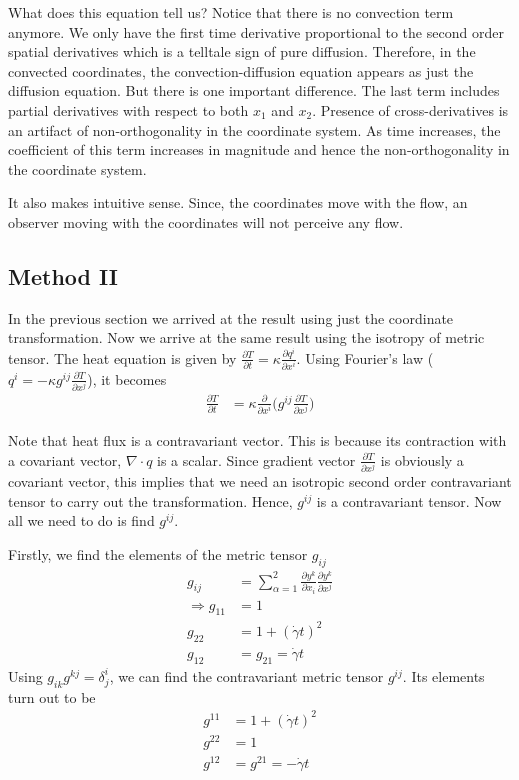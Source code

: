 \documentclass[11pt, letterpaper]{article}
\newcommand{\mdij}{\delta^i_j}
\newcommand{\1}{\bm{1}}
\newcommand{\gd}{\dot \gamma}
\newcommand{\pd}[2]{\frac{\partial #1}{\partial #2}}
\begin{document}
What does this equation tell us? Notice that there is no convection term anymore. We only have the first time derivative proportional to the second order spatial derivatives which is a telltale sign of pure diffusion. Therefore, in the convected coordinates, the convection-diffusion equation appears as just the diffusion equation. But there is one important difference. The last term includes partial derivatives with respect to both $x_1$ and $x_2$. Presence of cross-derivatives is an artifact of non-orthogonality in the coordinate system. As time increases, the coefficient of this term increases in magnitude and hence the non-orthogonality in the coordinate system. 

It also makes intuitive sense. Since, the coordinates move with the flow, an observer moving with the coordinates will not perceive any flow. 

\subsection{Method II}

In the previous section we arrived at the result using just the coordinate transformation. Now we arrive at the same result using the isotropy of metric tensor. The heat equation is given by $\pd T t = \kappa \pd {q^i}{x^i}$. Using Fourier's law ($q^i=-\kappa g^{ij} \pd {T} {x^j}$), it becomes
\begin{align*}
\pd{T}{t} &= \kappa \pd{}{x^i}\big(g^{ij} \pd{T}{x^j}\big)
\end{align*}

Note that heat flux is a contravariant vector. This is because its contraction with a covariant vector, $\nabla \cdot q$ is a scalar. Since gradient vector $\pd{T}{x^j}$ is obviously a covariant vector, this implies that we need an isotropic second order contravariant tensor to carry out the transformation. Hence, $g^{ij}$ is a contravariant tensor. Now all we need to do is find $g^{ij}$. 

Firstly, we find the elements of the metric tensor $g_{ij}$
\begin{align*}
g_{ij} &= \sum^{2}_{\alpha=1} \pd{y^k}{x_i}\pd{y^k}{x^j}\\
\Rightarrow g_{11} &= 1\\
g_{22} &= 1 + (\gd t)^2\\
g_{12} &= g_{21} = \gd t
\end{align*}
Using $g_{ik}g^{kj}=\mdij$, we can find the contravariant metric tensor $g^{ij}$. Its elements turn out to be
\begin{align*}
g^{11} &= 1 + (\gd t)^2\\
g^{22} &= 1\\
g^{12} &= g^{21} = -\gd t\\
\end{align*}
\end{document}
